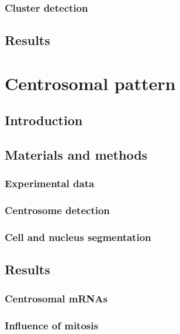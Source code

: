 \subsubsection{Cluster detection}

\subsection{Results}
\label{subsec:results_translation_factories}

\section{Centrosomal pattern}
\label{sec:centrosomal}

\subsection{Introduction}
\label{subsec:introduction_centrosomal}

\subsection{Materials and methods}
\label{subsec:materials_centrosomal}

\subsubsection{Experimental data}

\subsubsection{Centrosome detection}

\subsubsection{Cell and nucleus segmentation}

\subsection{Results}
\label{subsec:results_centrosomal}

\subsubsection{Centrosomal mRNAs}

\subsubsection{Influence of mitosis}


